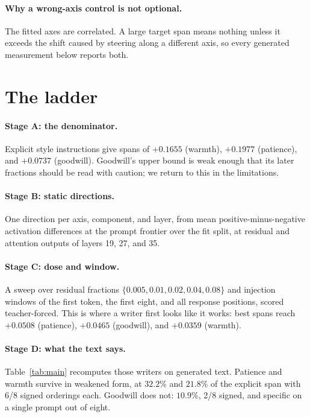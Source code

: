 \documentclass[10pt]{article}
\begin{document}
\paragraph{Why a wrong-axis control is not optional.} The fitted axes are
correlated. A large target span means nothing unless it exceeds the shift caused
by steering along a different axis, so every generated measurement below reports
both.

\section{The ladder}

\paragraph{Stage A: the denominator.} Explicit style instructions give spans of
$+0.1655$ (warmth), $+0.1977$ (patience), and $+0.0737$ (goodwill). Goodwill's
upper bound is weak enough that its later fractions should be read with caution;
we return to this in the limitations.

\paragraph{Stage B: static directions.} One direction per axis, component, and
layer, from mean positive-minus-negative activation differences at the prompt
frontier over the fit split, at residual and attention outputs of layers 19, 27,
and 35.

\paragraph{Stage C: dose and window.} A sweep over residual fractions
$\{0.005, 0.01, 0.02, 0.04, 0.08\}$ and injection windows of the first token,
the first eight, and all response positions, scored teacher-forced. This is
where a writer first looks like it works: best spans reach $+0.0508$ (patience),
$+0.0465$ (goodwill), and $+0.0359$ (warmth).

\paragraph{Stage D: what the text says.} Table~\ref{tab:main} recomputes those
writers on generated text. Patience and warmth survive in weakened form, at
$32.2\%$ and $21.8\%$ of the explicit span with 6/8 signed orderings each.
Goodwill does not: $10.9\%$, 2/8 signed, and specific on a single prompt out of
eight.
\end{document}
